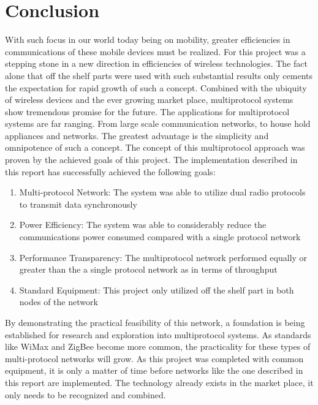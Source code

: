 \documentclass[conference]{IEEEtran}
\begin{document}
\section{Conclusion}
With such focus in our world today being on mobility, greater efficiencies in communications of these mobile devices must be realized.  For this project was a stepping stone in a new direction in efficiencies of wireless technologies.  The fact alone that off the shelf parts were used with such substantial results only cements the expectation for rapid growth of such a concept.  Combined with the ubiquity of wireless devices and the ever growing market place, multiprotocol systems show tremendous promise for the future.  The applications for multiprotocol systems are far ranging.  From large scale communication networks, to house hold appliances and networks.  The greatest advantage is the simplicity and omnipotence of such a concept.  The concept of this multiprotocol approach was proven by the achieved goals of this project. 
The implementation described in this report has successfully achieved the following goals:
\begin{enumerate}
  \item Multi-protocol Network:  The system was able to utilize dual radio protocols to transmit data synchronously
  \item Power Efficiency: The system was able to considerably reduce the communications power consumed compared with a single protocol network
  \item Performance Transparency:   The multiprotocol network performed equally or greater than the a single protocol network as  in terms of throughput
  \item Standard Equipment:  This project only utilized off the shelf part in both nodes of the network
\end{enumerate}

By demonstrating the practical feasibility of this network, a foundation is being established for research and exploration into multiprotocol systems. As standards like WiMax and ZigBee become more common, the practicality for these types of multi-protocol networks will grow. As this project was completed with common equipment, it is only a matter of time before networks like the one described in this report are implemented.  The technology already exists in the market place, it only needs to be recognized and combined.
\end{document}

